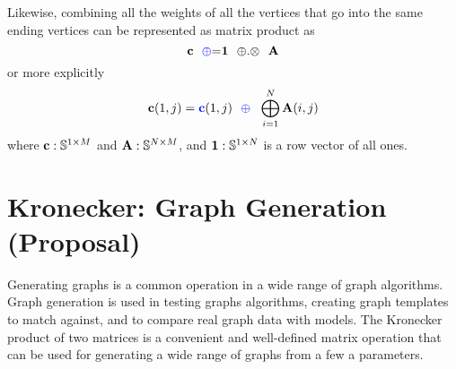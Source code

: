 Likewise, combining all the weights of all the vertices that go into the same ending vertices can be represented as matrix product as
$$
   {\bf c} ~~ {\textcolor{blue}{\oplus}}{=}  {\bf 1} ~~ {\oplus}.{\otimes} ~~{\bf A} 
$$
or more explicitly
$$
   {\bf c}(1,j) = {\textcolor{blue}{\bf c}}(1,j) ~~ {\textcolor{blue}{\oplus}} ~~ \bigoplus_{i=1}^N {\bf A}(i,j)
$$
where ${\bf c}: \mathbb{S}^{1 \times M}$ and ${\bf A}: \mathbb{S}^{N \times M}$, and ${\bf 1}: \mathbb{S}^{1 \times N}$ is a row vector of all ones.


\section{Kronecker: Graph Generation (Proposal)}

  Generating graphs is a common operation in a wide range of graph algorithms.  Graph generation is used in testing graphs algorithms, creating graph templates to match against, and to compare real graph data with models.  The Kronecker product of two matrices is a convenient and well-defined matrix operation that can be used for generating a wide range of graphs from a few a parameters.

